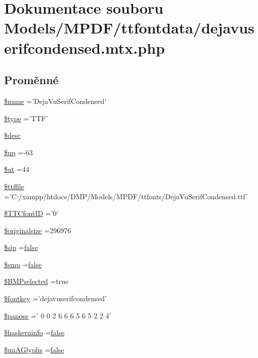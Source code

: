 \hypertarget{dejavuserifcondensed_8mtx_8php}{\section{Dokumentace souboru Models/\-M\-P\-D\-F/ttfontdata/dejavuserifcondensed.mtx.\-php}
\label{dejavuserifcondensed_8mtx_8php}
}
\subsection*{Proměnné}
\begin{DoxyCompactItemize}
\item 
\hyperlink{dejavuserifcondensed_8mtx_8php_ab2fc40d43824ea3e1ce5d86dee0d763b}{\$name} ='Deja\-Vu\-Serif\-Condensed'
\item 
\hyperlink{dejavuserifcondensed_8mtx_8php_a9a4a6fba2208984cabb3afacadf33919}{\$type} ='T\-T\-F'
\item 
\hyperlink{dejavuserifcondensed_8mtx_8php_a31059b9e4d0c5af34df20da32232ea9a}{\$desc}
\item 
\hyperlink{dejavuserifcondensed_8mtx_8php_a6b5ad2ac55f9df46e8f34e78fbd6f176}{\$up} =-\/63
\item 
\hyperlink{dejavuserifcondensed_8mtx_8php_aadd3f841051043ee58e587e840e8dd0b}{\$ut} =44
\item 
\hyperlink{dejavuserifcondensed_8mtx_8php_ab04cc39aa4badf22904a8e6ec08f49a9}{\$ttffile} ='C\-:/xampp/htdocs/D\-M\-P/Models/M\-P\-D\-F/ttfonts/Deja\-Vu\-Serif\-Condensed.\-ttf'
\item 
\hyperlink{dejavuserifcondensed_8mtx_8php_ac3b78779654cec2ec1f552d784f1b5f0}{\$\-T\-T\-Cfont\-I\-D} ='0'
\item 
\hyperlink{dejavuserifcondensed_8mtx_8php_a25e8bdbc8267d6e88bc21fde74a2c0e8}{\$originalsize} =296976
\item 
\hyperlink{dejavuserifcondensed_8mtx_8php_ac07984f1157f4b24cd953085cfc7d40c}{\$sip} =\hyperlink{ttfontsuni_8php_afbaa04e5cc97693dc668b3c45d3dd740}{false}
\item 
\hyperlink{dejavuserifcondensed_8mtx_8php_a7c2b1e4834c6dab47a78d2564d23935c}{\$smp} =\hyperlink{ttfontsuni_8php_afbaa04e5cc97693dc668b3c45d3dd740}{false}
\item 
\hyperlink{dejavuserifcondensed_8mtx_8php_a67fd6f661058b6635618e65431505e9b}{\$\-B\-M\-Pselected} =true
\item 
\hyperlink{dejavuserifcondensed_8mtx_8php_a97b81cd1a67db21cdcae44cc49307a27}{\$fontkey} ='dejavuserifcondensed'
\item 
\hyperlink{dejavuserifcondensed_8mtx_8php_adec3b939f59252683592e3ad31a0cd72}{\$panose} =' 0 0 2 6 6 6 5 6 5 2 2 4'
\item 
\hyperlink{dejavuserifcondensed_8mtx_8php_ad226b2764d22aeac7b4ec5d56b83128c}{\$haskerninfo} =\hyperlink{ttfontsuni_8php_afbaa04e5cc97693dc668b3c45d3dd740}{false}
\item 
\hyperlink{dejavuserifcondensed_8mtx_8php_a0306ade62464a165fe9fa56306f6dd17}{\$un\-A\-Glyphs} =\hyperlink{ttfontsuni_8php_afbaa04e5cc97693dc668b3c45d3dd740}{false}
\end{DoxyCompactItemize}


